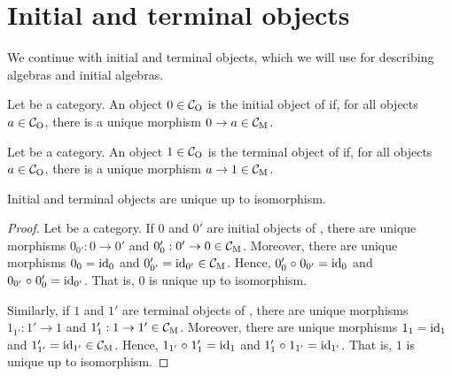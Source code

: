 \section{Initial and terminal objects}
\label{sec:constructions-initial-terminal-objects}

We continue with initial and terminal objects, which we will use for
describing algebras and initial algebras.

\begin{definition}
  \label{def:initial-object}


  Let  be a category. An object $0 \in \mathcal{C}_{\operatorname{O}}$ is the initial
  object of  if, for all objects $a \in \mathcal{C}_{\operatorname{O}}$, there is a
  unique morphism $0 \to a \in \mathcal{C}_{\operatorname{M}}$.

\end{definition}

\begin{definition}
  \label{def:terminal-object}


  Let  be a category. An object $1 \in \mathcal{C}_{\operatorname{O}}$ is the
  terminal object of  if, for all objects $a \in \mathcal{C}_{\operatorname{O}}$,
  there is a unique morphism $a \to 1 \in \mathcal{C}_{\operatorname{M}}$.

\end{definition}

\begin{lemma}

  Initial and terminal objects are unique up to isomorphism.

  \begin{proof}

    Let  be a category. If $0$ and $0'$ are initial objects of
    , there are unique morphisms $0_{0'}: 0 \to 0'$ and
    $0'_{0}: 0' \to 0 \in \mathcal{C}_{\operatorname{M}}$. Moreover, there are unique
    morphisms $0_{0} = \operatorname{id}_{0}$ and $0'_{0'} = \operatorname{id}_{0'} \in \mathcal{C}_{\operatorname{M}}$.
    Hence, $0'_{0} \mathrel{\circ} 0_{0'} = \operatorname{id}_{0}$ and $0_{0'} \mathrel{\circ} 0'_{0} =
    \operatorname{id}_{0'}$. That is, $0$ is unique up to isomorphism.

    Similarly, if $1$ and $1'$ are terminal objects of , there
    are unique morphisms $1_{1'}: 1' \to 1$ and $1'_{1}: 1 \to 1' \in
    \mathcal{C}_{\operatorname{M}}$. Moreover, there are unique morphisms $1_{1} = \operatorname{id}_{1}$
    and $1'_{1'} = \operatorname{id}_{1'} \in \mathcal{C}_{\operatorname{M}}$. Hence, $1_{1'} \mathrel{\circ} 1'_{1}
    = \operatorname{id}_{1}$ and $1'_{1} \mathrel{\circ} 1_{1'} = \operatorname{id}_{1'}$. That is, $1$ is
    unique up to isomorphism.

  \end{proof}

\end{lemma}


